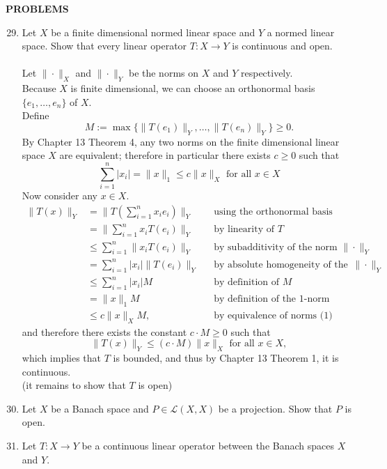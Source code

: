 \begin{center}
	\textbf{PROBLEMS}
\end{center}
\begin{enumerate}
	\setcounter{enumi}{28}
    \item Let $X$ be a finite dimensional normed linear space and $Y$ a normed linear space.
    Show that every linear operator $T:X\to Y$ is continuous and open.\\
    \\Let $\|\cdot\|_X$ and $\|\cdot\|_Y$ be the norms on $X$ and $Y$ respectively.
    \\Because $X$ is finite dimensional, we can choose an orthonormal basis $\{e_1,\dots,e_n\}$ of $X$.
    \\Define 
    \[
        M:=\max\{\|T(e_1)\|_Y,\dots,\|T(e_n)\|_Y\}\ge0.
    \]
    By Chapter 13 Theorem 4, any two norms on the finite dimensional linear space $X$ are equivalent; 
    therefore in particular there exists $c\ge0$ such that
    \[
        \sum_{i=1}^n|x_i|=\|x\|_1\le c\|x\|_X\text{ for all }x\in X\tag{1}
    \] 
    Now consider any $x\in X$.
    \begin{align*}
        \|T(x)\|_Y&=\|T(\sum_{i=1}^nx_ie_i)\|_Y&&\text{using the orthonormal basis}\\
        &=\|\sum_{i=1}^nx_iT(e_i)\|_Y&&\text{by linearity of }T\\
        &\le\sum_{i=1}^n\|x_iT(e_i)\|_Y&&\text{by subadditivity of the norm }\|\cdot\|_Y\\
        &=\sum_{i=1}^n|x_i|\|T(e_i)\|_Y&&\text{by absolute homogeneity of the norm }\|\cdot\|_Y\\
        &\le\sum_{i=1}^n|x_i|M&&\text{by definition of }M\\
        &=\|x\|_1M&&\text{by definition of the 1-norm}\\
        &\le c\|x\|_XM,&&\text{by equivalence of norms (1)}
    \end{align*}
    and therefore there exists the constant $c\cdot M\ge0$ such that 
    \[
        \|T(x)\|_Y\le(c\cdot M)\|x\|_X\text{ for all }x\in X,
    \]
    which implies that $T$ is bounded, and thus by Chapter 13 Theorem 1, it is continuous.
    \\(it remains to show that $T$ is open)
    \item Let $X$ be a Banach space and $P\in\mathcal{L}(X,X)$ be a projection.
    Show that $P$ is open.
    \item Let $T:X\to Y$ be a continuous linear operator between the Banach spaces $X$ and $Y$.

\end{enumerate}
